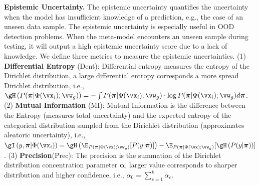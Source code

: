 \textbf{Epistemic Uncertainty.}
The epistemic uncertainty quantifies the uncertainty when the model has insufficient knowledge of a prediction, e.g., 
the case of an unseen data sample. The epistemic uncertainty is especially useful in OOD detection problems. When the meta-model encounters an unseen sample during testing, it will output a high epistemic uncertainty score due to a lack of knowledge. We define three metrics to measure the epistemic uncertainties. (1) \textbf{Differential Entropy} (Dent): Differential entropy measures the entropy of the Dirichlet distribution, a large differential entropy corresponds a more spread Dirichlet distribution, i.e., $\gH\left(P(\boldsymbol{\pi}| \Phi(\vx_i); \vw_g) \right) = -\int P(\boldsymbol{\pi}| \Phi(\vx_i); \vw_g)\cdot \log{P(\boldsymbol{\pi}| \Phi(\vx_i); \vw_g)} d\boldsymbol{\pi}$. (2) \textbf{Mutual Information} (MI): Mutual Information is the difference between the Entropy (measures total uncertainty) and the expected entropy of the categorical distribution sampled from the Dirichlet distribution (approximates aleatoric uncertainty), i.e., $\gI\left(y,\boldsymbol{\pi}|\Phi(\vx_i) \right) = \gH\left(\E_{P(\boldsymbol{\pi}|\Phi(\vx); \vw_g)} [P(y|\boldsymbol{\pi})]\right)- \E_{P(\boldsymbol{\pi}|\Phi(\vx); \vw_g)}[\gH\left(P(y|\boldsymbol{\pi})\right)]$.  (3) \textbf{Precision}(Prec): The precision is the summation of the Dirichlet distribution concentration parameter $\boldsymbol{\alpha}$, larger value corresponds to sharper distribution and higher confidence, i.e., $\alpha_0 = \sum_{c=1}^k \alpha_c$.
